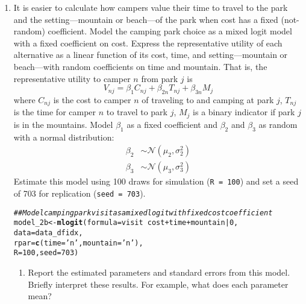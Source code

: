 \documentclass[11pt,letterpaper]{article}\usepackage[]{graphicx}\usepackage[]{xcolor}
\makeatletter
\newcommand{\hlnum}[1]{\textcolor[rgb]{0.686,0.059,0.569}{#1}}%
\newcommand{\hlstr}[1]{\textcolor[rgb]{0.192,0.494,0.8}{#1}}%
\newcommand{\hlcom}[1]{\textcolor[rgb]{0.678,0.584,0.686}{\textit{#1}}}%
\newcommand{\hlopt}[1]{\textcolor[rgb]{0,0,0}{#1}}%
\newcommand{\hlstd}[1]{\textcolor[rgb]{0.345,0.345,0.345}{#1}}%
\newcommand{\hlkwb}[1]{\textcolor[rgb]{0.69,0.353,0.396}{#1}}%
\newcommand{\hlkwc}[1]{\textcolor[rgb]{0.333,0.667,0.333}{#1}}%
\newcommand{\hlkwd}[1]{\textcolor[rgb]{0.737,0.353,0.396}{\textbf{#1}}}%
\newenvironment{kframe}{%
 \def\at@end@of@kframe{}%
 \ifinner\ifhmode%
  \def\at@end@of@kframe{\end{minipage}}%
  \begin{minipage}{\columnwidth}%
 \fi\fi%
 \def\FrameCommand##1{\hskip\@totalleftmargin \hskip-\fboxsep
 \colorbox{shadecolor}{##1}\hskip-\fboxsep
     \hskip-\linewidth \hskip-\@totalleftmargin \hskip\columnwidth}%
 \MakeFramed {\advance\hsize-\width
   \@totalleftmargin\z@ \linewidth\hsize
   \@setminipage}}%
 {\par\unskip\endMakeFramed%
 \at@end@of@kframe}
\newenvironment{knitrout}{}{} %
\makeatother
\begin{document}
\begin{enumerate}[label=\alph*., leftmargin=*]
	\item It is easier to calculate how campers value their time to travel to the park and the setting---mountain or beach---of the park when cost has a fixed (not-random) coefficient. Model the camping park choice as a mixed logit model with a fixed coefficient on cost. Express the representative utility of each alternative as a linear function of its cost, time, and setting---mountain or beach---with random coefficients on time and mountain. That is, the representative utility to camper $n$ from park $j$ is
	$$V_{nj} = \beta_1 C_{nj} + \beta_{2n} T_{nj} + \beta_{3n} M_j$$
	where $C_{nj}$ is the cost to camper $n$ of traveling to and camping at park $j$, $T_{nj}$ is the time for camper $n$ to travel to park $j$, $M_j$ is a binary indicator if park $j$ is in the mountains. Model $\beta_1$ as a fixed coefficient and $\beta_2$ and $\beta_3$ as random with a normal distribution:
	\begin{align*}
		\beta_2 & \sim \mathcal{N}(\mu_2, \sigma_2^2) \\
		\beta_3 & \sim \mathcal{N}(\mu_3, \sigma_3^2)
	\end{align*}
	Estimate this model using 100 draws for simulation (\texttt{R = 100}) and set a seed of 703 for replication (\texttt{seed = 703}).

\begin{knitrout}
\color{fgcolor}\begin{kframe}
\begin{alltt}
\hlcom{## Model camping park visit as a mixed logit with fixed cost coefficient}
\hlstd{model_2b} \hlkwb{<-} \hlkwd{mlogit}\hlstd{(}\hlkwc{formula} \hlstd{= visit} \hlopt{~} \hlstd{cost} \hlopt{+} \hlstd{time} \hlopt{+} \hlstd{mountain} \hlopt{|} \hlnum{0}\hlstd{,}
                   \hlkwc{data} \hlstd{= data_dfidx,}
                   \hlkwc{rpar} \hlstd{=} \hlkwd{c}\hlstd{(}\hlkwc{time} \hlstd{=} \hlstr{'n'}\hlstd{,} \hlkwc{mountain} \hlstd{=} \hlstr{'n'}\hlstd{),}
                   \hlkwc{R} \hlstd{=} \hlnum{100}\hlstd{,} \hlkwc{seed} \hlstd{=} \hlnum{703}\hlstd{)}
\end{alltt}
\end{kframe}
\end{knitrout}

	\begin{enumerate}[label=\roman*.]
		\item Report the estimated parameters and standard errors from this model. Briefly interpret these results. For example, what does each parameter mean?


\end{enumerate}
\end{enumerate}
\end{document}
